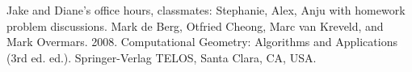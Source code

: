 \documentclass [12pt]{article}
\begin{document}
    
        




    




\begin{thebibliography}{1}
    Jake and Diane's office hours, classmates: Stephanie, Alex, Anju with homework problem discussions.
    Mark de Berg, Otfried Cheong, Marc van Kreveld, and Mark Overmars. 2008. Computational Geometry: Algorithms and Applications (3rd ed. ed.). Springer-Verlag TELOS, Santa Clara, CA, USA.
\end{thebibliography}
\end{document}
